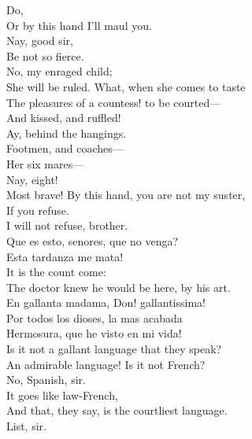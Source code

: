 \documentclass[a4paper,oneside,12pt]{memoir}
\begin{document}
\begin{drama*}
\kastrilspeaks {} Do,\\
Or by this hand I'll maul you.\\
\facespeaks {} Nay, good sir,\\
Be not so fierce.\\
\subtlespeaks {} No, my enraged child;\\
She will be ruled. What, when she comes to taste\\
The pleasures of a countess! to be courted---\\
\facespeaks And kissed, and ruffled!\\
\subtlespeaks {} Ay, behind the hangings.\\
\facespeaks Footmen, and coaches---\\
\subtlespeaks {} Her six mares---\\
\facespeaks {} Nay, eight!\\
\kastrilspeaks Most brave! By this hand, you are not my suster,\\
If you refuse.\\
\pliantspeaks {} I will not refuse, brother.\\
\surlyspeaks Que es esto, senores, que no venga?\\
Esta tardanza me mata!\\
\facespeaks {} It is the count come:\\
The doctor knew he would be here, by his art.\\
\subtlespeaks En gallanta madama, Don! gallantissima!\\
\surlyspeaks Por todos los dioses, la mas acabada\\
Hermosura, que he visto en mi vida!\\
\facespeaks Is it not a gallant language that they speak?\\
\kastrilspeaks An admirable language! Is it not French?\\
\facespeaks No, Spanish, sir.\\
\kastrilspeaks {} It goes like law-French,\\
And that, they say, is the courtliest language.\\
\facespeaks {} List, sir.\\

\end{drama*}
\end{document}
